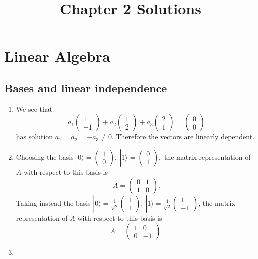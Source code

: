 \documentclass[12 pt]{article}
\begin{document}
\title{Chapter 2 Solutions}
\author{}
\date{}
\maketitle
\section{Linear Algebra}
\subsection{Bases and linear independence}
\begin{enumerate}
\item We see that 
$$a_1\begin{pmatrix}
	1\\-1
\end{pmatrix}+a_2\begin{pmatrix}
	1\\2
\end{pmatrix}+a_3\begin{pmatrix}
	2\\1
\end{pmatrix}=\begin{pmatrix}
	0\\0
\end{pmatrix}$$
has solution $a_1=a_2=-a_3 \neq 0$. Therefore the vectors are linearly dependent.
\item Choosing the basis $|0\rangle =\begin{pmatrix}
	1\\0
\end{pmatrix}, \ |1\rangle =\begin{pmatrix}
	0\\1
\end{pmatrix},$ the matrix representation of $A$ with respect to this basis is 
$$A=\begin{pmatrix}
	0&1\\1&0
\end{pmatrix}.$$
Taking instead the basis $|0\rangle=\frac{1}{\sqrt{2}}\begin{pmatrix}
	1\\1
\end{pmatrix}, \ |1\rangle=\frac{1}{\sqrt{2}}\begin{pmatrix}
	1\\-1
\end{pmatrix}$, the matrix representation of $A$ with respect to this basis is
$$A=\begin{pmatrix}
	1&0\\0&-1
\end{pmatrix}.$$
\item 
\end{enumerate}
\end{document}
